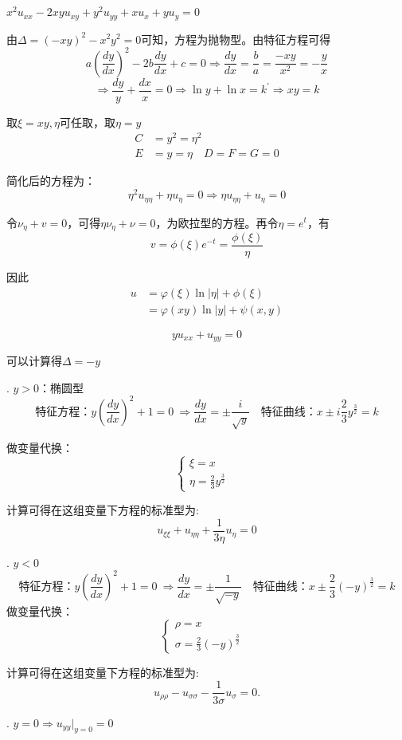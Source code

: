 \begin{ex}$x^{2}u_{xx}-2xyu_{xy}+y^{2}u_{yy}+xu_{x}+yu_{y}=0$

    由$\Delta=(-xy)^{2}-x^{2}y^{2}=0$可知，方程为抛物型。由特征方程可得
    $$a(\frac{dy}{dx})^{2}-2b\frac{dy}{dx}+c=0\Rightarrow\frac{dy}{dx}=\frac{b}{a}=\frac{-xy}{x^{2}}=-\frac{y}{x}$$
    $$\Rightarrow\frac{dy}{y}+\frac{dx}{x}=0\Rightarrow\ln y+\ln x=k^{\prime}\Rightarrow xy=k$$

    取$\xi=xy,\eta$可任取，取$\eta=y$
    $$\begin{aligned}C&=y^{2}=\eta^{2}\\E&=y=\eta\quad D=F=G=0\end{aligned}$$
    
    简化后的方程为：
    $$\eta^2u_{\eta\eta}+\eta u_\eta=0\Rightarrow\eta u_{\eta\eta}+u_\eta=0$$

    令$\nu_\eta+v=0$，可得$\eta \nu_\eta+\nu=0$，为欧拉型的方程。再令$\eta=e^t$，有
    $$v=\phi(\xi)e^{-t}=\frac{\phi(\xi)}{\eta}$$
    
    因此
    $$\begin{aligned}u&=\varphi(\xi)\ln|\eta|+\phi(\xi)\\&=\varphi(xy)\ln|y|+\psi(x,y)\end{aligned}$$
\end{ex}

\begin{ex}[Tricomi方程]
    $$yu_{xx}+u_{yy}=0$$

    可以计算得$\Delta=-y$

    . $y>0$：椭圆型
    $$\text{特征方程：}y(\frac{dy}{dx})^{2}+1=0\ \Rightarrow\frac{dy}{dx}=\pm\frac{i}{\sqrt{y}}\quad\text{特征曲线：} x\pm i\frac{2}{3}y^{\frac{3}{2}}=k$$
    
    做变量代换：
    $$\begin{cases}\xi=x\\\eta=\frac23y^\frac32&\end{cases}$$

    计算可得在这组变量下方程的标准型为:
    $$u_{\xi\xi}+u_{\eta\eta}+\frac{1}{3\eta}u_{\eta}=0$$
    

    . $y<0$ 
    $$\text{特征方程：}y(\frac{dy}{dx})^{2}+1=0\ \Rightarrow\frac{dy}{dx}=\pm\frac{1}{\sqrt{-y}}\quad\text{特征曲线：} x\pm \frac{2}{3}(-y)^{\frac{3}{2}}=k$$
    做变量代换：
    $$\begin{cases}\rho=x\\\sigma=\frac23(-y)^{\frac32}&\end{cases}$$

    计算可得在这组变量下方程的标准型为:
    $$u_{\rho\rho}-u_{\sigma\sigma}-\frac1{3\sigma}u_\sigma=0.$$

    . $y=0\Rightarrow u_{yy}|_{y=0}=0$

\end{ex}

